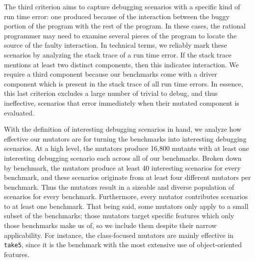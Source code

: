 The third criterion aims to capture debugging scenarios with a specific
kind of run time error: one produced because of the interaction between the buggy
portion of the program with the rest of the program.  In these cases, the rational programmer
may need to examine several pieces of the program to locate the source of the faulty interaction.
In technical terms, we reliably mark these scenarios by
analyzing the stack trace of a run time error.  If the stack trace mentions at
least two distinct components, then this indicates interaction.  We require a third component because our benchmarks come
with a driver component which is present in the stack trace of all run
time errors. In essence, this last criterion excludes a large number of
trivial to debug, and thus ineffective, scenarios that error immediately when their mutated component is
evaluated. 




With the definition of interesting debugging scenarios in hand, we analyze how effective our mutators
are for turning the benchmarks into interesting debugging scenarios.
At a high level, the mutators produce 16,800 mutants with at least one interesting debugging scenario each across all of our benchmarks.
Broken down by benchmark, the mutators produce at least 40 interesting
scenarios for every benchmark, and these scenarios originate from at
least four different mutators per benchmark.  Thus the mutators result in 
a sizeable and diverse population of scenarios for every benchmark.
Furthermore, every mutator contributes scenarios to at least one
benchmark.
That being said, some mutators only apply to a small subset of the benchmarks;
those mutators target specific features which only those benchmarks make us of, so we include them despite their narrow applicability.
For instance, the class-focused mutators are mainly effective in \texttt{take5}, since it is the benchmark with the most extensive use of object-oriented features.
